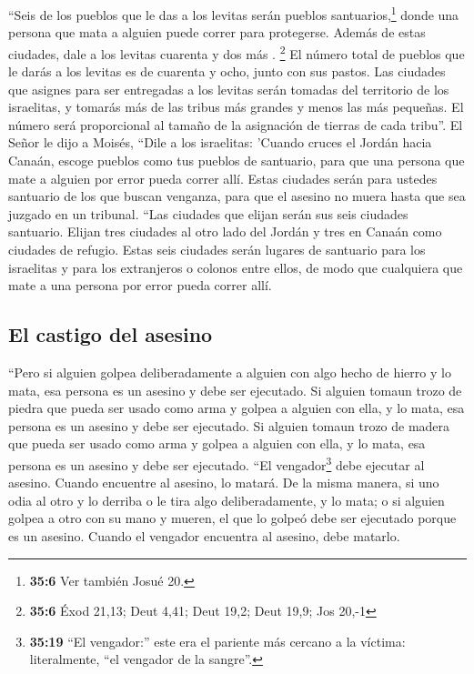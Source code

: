  ``Seis de los pueblos que le das a los levitas serán
pueblos santuarios,\footnote{\textbf{35:6} Ver también Josué 20.} donde
una persona que mata a alguien puede correr para protegerse. Además de
estas ciudades, dale a los levitas cuarenta y dos más . \footnote{\textbf{35:6}
  Éxod 21,13; Deut 4,41; Deut 19,2; Deut 19,9; Jos 20,-1} 
El número total de pueblos que le darás a los levitas es de cuarenta y
ocho, junto con sus pastos.  Las ciudades que asignes para
ser entregadas a los levitas serán tomadas del territorio de los
israelitas, y tomarás más de las tribus más grandes y menos las más
pequeñas. El número será proporcional al tamaño de la asignación de
tierras de cada tribu''.  El Señor le dijo a Moisés,
 ``Dile a los israelitas: 'Cuando cruces el Jordán hacia
Canaán,  escoge pueblos como tus pueblos de santuario,
para que una persona que mate a alguien por error pueda correr allí.
 Estas ciudades serán para ustedes santuario de los que
buscan venganza, para que el asesino no muera hasta que sea juzgado en
un tribunal.  ``Las ciudades que elijan serán sus seis
ciudades santuario.  Elijan tres ciudades al otro lado
del Jordán y tres en Canaán como ciudades de refugio. 
Estas seis ciudades serán lugares de santuario para los israelitas y
para los extranjeros o colonos entre ellos, de modo que cualquiera que
mate a una persona por error pueda correr allí.

\hypertarget{el-castigo-del-asesino}{%
\subsection{El castigo del asesino}\label{el-castigo-del-asesino}}

 ``Pero si alguien golpea deliberadamente a alguien con
algo hecho de hierro y lo mata, esa persona es un asesino y debe ser
ejecutado.  Si alguien tomaun trozo de piedra que pueda
ser usado como arma y golpea a alguien con ella, y lo mata, esa persona
es un asesino y debe ser ejecutado.  Si alguien tomaun
trozo de madera que pueda ser usado como arma y golpea a alguien con
ella, y lo mata, esa persona es un asesino y debe ser ejecutado.
 ``El vengador\footnote{\textbf{35:19} ``El vengador:''
  este era el pariente más cercano a la víctima: literalmente, ``el
  vengador de la sangre''.} debe ejecutar al asesino. Cuando encuentre
al asesino, lo matará.  De la misma manera, si uno odia
al otro y lo derriba o le tira algo deliberadamente, y lo mata;
 o si alguien golpea a otro con su mano y mueren, el que
lo golpeó debe ser ejecutado porque es un asesino. Cuando el vengador
encuentra al asesino, debe matarlo.

